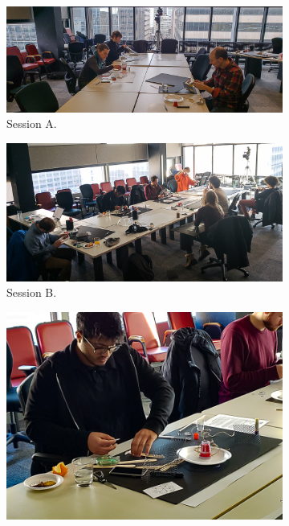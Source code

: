 \documentclass[letterpaper, 12pt]{article}
\begin{document}

\begin{figure}[htbp]
    \centering
    \begin{subfigure}[]{1\textwidth}
        \centering
        \includegraphics[width=1\textwidth]{ch3_dfp_nfp_A.jpg}
        \caption{Session A.}
    \end{subfigure}
    \par\bigskip
    \begin{subfigure}[]{0.59\textwidth}
        \centering
        \includegraphics[width=1\textwidth]{ch3_dfp_nfp_B.jpg}
        \caption{Session B.}
    \end{subfigure}
    \begin{subfigure}[]{0.4\textwidth}
        \centering
        \includegraphics[width=1\textwidth]{ch3_dfp_nfp_B_P4.jpg}

\end{subfigure}
\end{figure}
\end{document}

